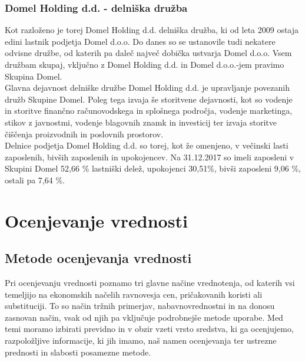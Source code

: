 \documentclass[12pt,a4paper]{amsart}
\theoremstyle{definition} %
\theoremstyle{plain} %
\begin{document}
\subsubsection{Domel Holding d.d. - delniška družba}
Kot razloženo je torej Domel Holding d.d. delniška družba, ki od leta 2009 ostaja edini lastnik podjetja Domel d.o.o. Do danes so se ustanovile tudi nekatere odvisne družbe, od katerih pa daleč največ dobička ustvarja Domel d.o.o. Vsem družbam skupaj, vključno z Domel Holding d.d. in Domel d.o.o.-jem pravimo Skupina Domel.\\
Glavna dejavnost delniške družbe Domel Holding d.d. je upravljanje povezanih družb Skupine Domel. Poleg tega izvaja še storitvene dejavnosti, kot so vodenje in storitve finančno računovodskega in splošnega področja, vodenje marketinga, stikov z javnostmi, vodenje blagovnih znamk in investicij ter izvaja storitve čiščenja proizvodnih in poslovnih prostorov. \\
Delnice podjetja Domel Holding d.d. so torej, kot že omenjeno, v večinski lasti zaposlenih, bivših zaposlenih in upokojencev. Na 31.12.2017 so imeli zaposleni v Skupini Domel 52,66 \% lastniški delež, upokojenci 30,51\%, bivši zaposleni 9,06 \%, ostali pa 7,64 \%. 




\section{Ocenjevanje vrednosti}
\subsection{Metode ocenjevanja vrednosti}
Pri ocenjevanju vrednosti poznamo tri glavne načine vrednotenja, od katerih vsi temeljijo na ekonomskih načelih ravnovesja cen, pričakovanih koristi ali substituciji. To so način tržnih primerjav, nabavnovrednostni in na donosu zasnovan način, vsak od njih pa vključuje podrobnejše metode uporabe. Med temi moramo izbirati previdno in v obzir vzeti vrsto sredstva, ki ga ocenjujemo, razpoložljive informacije, ki jih imamo, naš namen ocenjevanja ter ustrezne prednosti in slabosti posamezne metode. 
\end{document}
